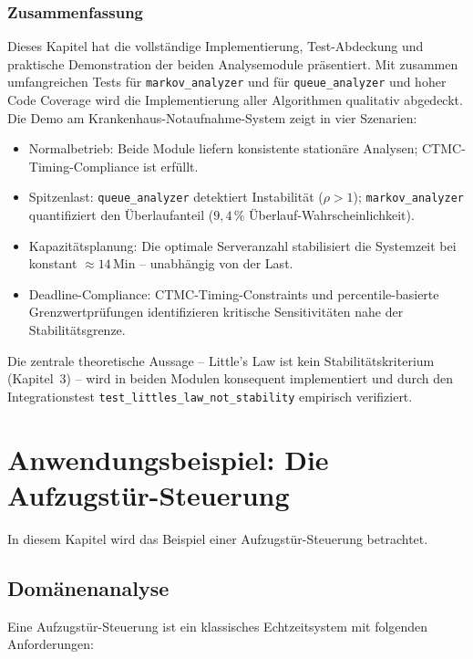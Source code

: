 ﻿\documentclass[a4paper,12pt]{report}
\theoremstyle{definition}
\begin{document}
\subsection{Zusammenfassung}

Dieses Kapitel hat die vollständige Implementierung, Test-Abdeckung und
praktische Demonstration der beiden Analysemodule präsentiert.
Mit zusammen umfangreichen Tests für \texttt{markov\_analyzer} und für
\texttt{queue\_analyzer} und hoher Code Coverage wird die
Implementierung aller Algorithmen qualitativ abgedeckt. Die Demo am
Krankenhaus-Notaufnahme-System zeigt in vier Szenarien:

\begin{itemize}
	\item[-] Normalbetrieb: Beide Module liefern konsistente stationäre
	Analysen; CTMC-Timing-Compliance ist erfüllt.
	\item[-] Spitzenlast: \texttt{queue\_analyzer} detektiert Instabilität
	($\rho > 1$); \texttt{markov\_analyzer} quantifiziert den Überlaufanteil
	($9{,}4\,\%$ Überlauf-Wahrscheinlichkeit).
	\item[-] Kapazitätsplanung: Die optimale Serveranzahl stabilisiert
	die Systemzeit bei konstant $\approx 14$\,Min -- unabhängig von der Last.
	\item[-] Deadline-Compliance: CTMC-Timing-Constraints und percentile-basierte
	Grenzwertprüfungen identifizieren kritische Sensitivitäten nahe der
	Stabilitätsgrenze.
\end{itemize}

Die zentrale theoretische Aussage -- Little's Law ist kein Stabilitätskriterium
(Kapitel~3) -- wird in beiden Modulen konsequent implementiert und durch
den Integrationstest \texttt{test\_littles\_law\_not\_stability} empirisch
verifiziert.

\chapter{Anwendungsbeispiel: Die Aufzugstür-Steuerung}
\label{ch:aufzugstuer}

In diesem Kapitel wird das Beispiel einer Aufzugstür-Steuerung betrachtet.

\section{Domänenanalyse}

Eine Aufzugstür-Steuerung ist ein klassisches Echtzeitsystem mit folgenden Anforderungen:
\end{document}
